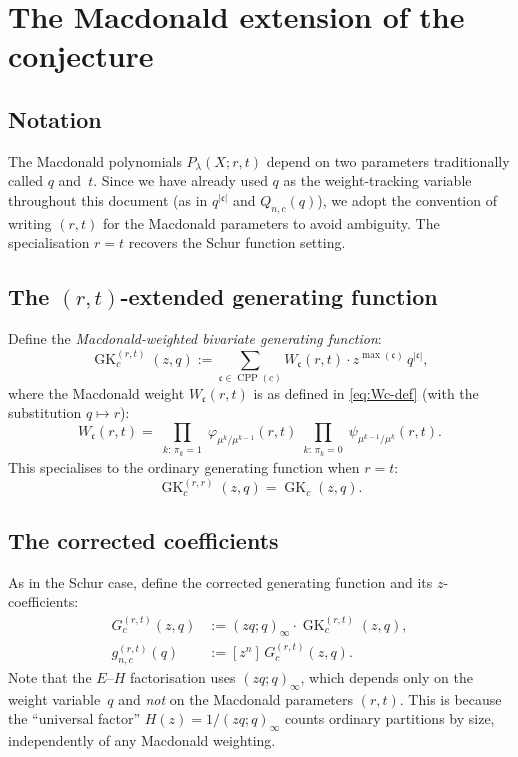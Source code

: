 \documentclass[11pt]{article}
\theoremstyle{plain}
\theoremstyle{definition}
\newcommand{\GK}{\operatorname{GK}}
\newcommand{\CPP}{\operatorname{CPP}}
\newcommand{\qpoch}[2]{(#1;#2)_\infty}
\begin{document}
\section{The Macdonald extension of the conjecture}
\label{sec:mac-conjecture}

\subsection{Notation}

The Macdonald polynomials $P_\lambda(X;r,t)$ depend on two parameters
traditionally called $q$ and~$t$.  Since we have already used $q$ as the
weight-tracking variable throughout this document (as in $q^{|\mathfrak{c}|}$
and $Q_{n,c}(q)$), we adopt the convention of writing $(r,t)$ for the
Macdonald parameters to avoid ambiguity.  The specialisation $r = t$
recovers the Schur function setting.

\subsection{The $(r,t)$-extended generating function}

Define the \emph{Macdonald-weighted bivariate generating function}:
\begin{equation}
  \GK_c^{(r,t)}(z,q)
  := \sum_{\mathfrak{c} \in \CPP(c)}
  W_{\mathfrak{c}}(r,t) \cdot z^{\max(\mathfrak{c})}\, q^{|\mathfrak{c}|},
  \label{eq:GK-rt}
\end{equation}
where the Macdonald weight $W_{\mathfrak{c}}(r,t)$ is as defined in
\eqref{eq:Wc-def} (with the substitution $q \mapsto r$):
\[
  W_{\mathfrak{c}}(r,t)
  = \prod_{\substack{k:\,\pi_k = 1}}
    \varphi_{\mu^k/\mu^{k-1}}(r,t)
    \prod_{\substack{k:\,\pi_k = 0}}
    \psi_{\mu^{k-1}/\mu^k}(r,t).
\]
This specialises to the ordinary generating function when $r = t$:
\[
  \GK_c^{(r,r)}(z,q) = \GK_c(z,q).
\]

\subsection{The corrected coefficients}

As in the Schur case, define the corrected generating function and
its $z$-coefficients:
\begin{align}
  G_c^{(r,t)}(z,q)
  &:= \qpoch{zq}{q} \cdot \GK_c^{(r,t)}(z,q),
  \label{eq:Gc-rt} \\
  g_{n,c}^{(r,t)}(q)
  &:= [z^n]\, G_c^{(r,t)}(z,q).
  \label{eq:gn-rt}
\end{align}
Note that the $E$--$H$ factorisation uses $\qpoch{zq}{q}$, which depends
only on the weight variable~$q$ and \emph{not} on the Macdonald
parameters $(r,t)$.  This is because the ``universal factor''
$H(z) = 1/\qpoch{zq}{q}$ counts ordinary partitions by size,
independently of any Macdonald weighting.
\end{document}
